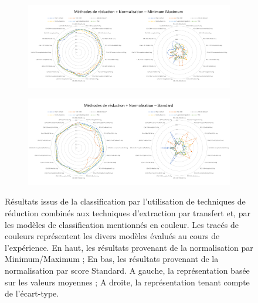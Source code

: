 \begin{figure}[H]
    \centering
    
    \begin{subfigure}{\textwidth}
      \includegraphics[width=\textwidth]{contents/chapter_4/resources/results_image_classification_reduction_mms.pdf}
    \end{subfigure}
    
    \begin{subfigure}{\textwidth}
      \includegraphics[width=\textwidth]{contents/chapter_4/resources/results_image_classification_reduction_ss.pdf}
    \end{subfigure}
    
    \caption{Résultats issus de la classification par l'utilisation de techniques de réduction combinés aux techniques d'extraction par transfert et, par les modèles de classification mentionnés en couleur. Les tracés de couleurs représentent les divers modèles évalués au cours de l'expérience. En haut, les résultats provenant de la normalisation par Minimum/Maximum ; En bas, les résultats provenant de la normalisation par score Standard. A gauche, la représentation basée sur les valeurs moyennes ; A droite, la représentation tenant compte de l'écart-type.}
    \label{fig:results_image_classification_reduction}
\end{figure}\par

